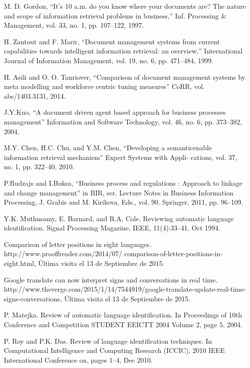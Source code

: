 \documentclass[runningheads,a4paper]{llncs}
\theoremstyle{break}
\begin{document}
%
%
\begin{thebibliography}{5}
M. D. Gordon, ``It's 10 a.m. do you know where your documents are? The nature and scope of information retrieval problems in business,'' Inf. Processing \& Management, vol. 33, no. 1, pp. 107–122, 1997.

H. Zantout and F. Marir, ``Document management systems from current capabilities towards intelligent information retrieval: an overview,'' International Journal of Information Management, vol. 19, no. 6, pp. 471–484, 1999.

H. Asili and O. O. Tanriover, ``Comparison of document management systems by meta modelling and workforce centric tuning measures'' CoRR, vol. abs/1403.3131, 2014.

J.Y.Kuo, ``A document driven agent based approach for business processes management'' Information and Software Technology, vol. 46, no. 6, pp. 373–382, 2004.

M.Y. Chen, H.C. Chu, and Y.M. Chen, ``Developing a semanticenable information retrieval mechanism'' Expert Systems with Appli- cations, vol. 37, no. 1, pp. 322–40, 2010.

P.Rudzajs and I.Buksa, ``Business process and regulations : Approach to linkage and change management'' in BIR, ser. Lecture Notes in Business Information Processing, J. Grabis and M. Kirikova, Eds., vol. 90. Springer, 2011, pp. 96–109.

Y.K. Muthusamy, E. Barnard, and R.A. Cole. Reviewing automatic language identification. Signal Processing Magazine, IEEE, 11(4):33–41, Oct 1994.

Comparison of letter positions in eight languages. http://www.prooffreader.com/2014/07/ comparison-of-letter-positions-in-eight.html, Última visita el 13 de Septiembre de 2015.

Google translate can now interpret signs and conversations in real time. http://www.theverge.com/2015/1/14/7544919/google-translate-update-real-time-signs-conversations, Última visita el 13 de Septiembre de 2015.

P. Matejka. Review of automatic language identification. In Proceedings of 10th Conference and Competition STUDENT EEICTT 2004 Volume 2, page 5, 2004.

P. Roy and P.K. Das. Review of language identification techniques. In Computational Intelligence and Computing Research (ICCIC), 2010 IEEE International Conference on, pages 1–4, Dec 2010.


\end{thebibliography}
\end{document}
